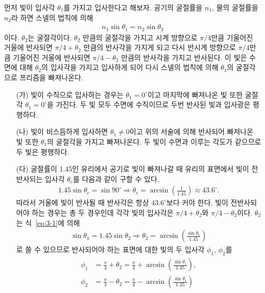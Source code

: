 \documentclass[tightenlines,floatfix,nofootinbib,superscriptaddress,fleqn]{revtex4-2}
\begin{document}
먼저 빛이 입사각 $\theta_1$를 가지고 입사한다고 해보자. 공기의 굴절률을 $n_1$,
물의 굴절률을 $n_2$라 하면 스넬의 법칙에 의해
\begin{align}\label{eq:3-1}
  n_1\sin\theta_1 = n_2\sin\theta_2
\end{align}
이다. $\theta_2$는 굴절각이다. $\theta_2$ 만큼의 굴절각을 가지고 
시계 방향으로 $\pi/4$만큼 기울어진 거울에 반사되면 $\pi/4+\theta_2$ 만큼의 반사각을
가지게 되고 다시 반시계 방향으로 $\pi/4$만큼 기울어진 거울에 반사되면 $\pi/4-\theta_2$
만큼의 반사각을 가지고 반사된다. 이 빛은 수면에 대해 $\theta_2$의 입사각을 가지고
입사하게 되어 다시 스넬의 법칙에 의해 $\theta_1$의 굴절각으로 프리즘을 빠져나온다.
\begin{itemize}
  \item[(가)]
  빛이 수직으로 입사하는 경우는 $\theta_1=0^\circ$이고 마지막에 빠져나온 빛 또한 굴절각
  $\theta_1=0^\circ$을 가진다. 두 빛 모두 수면에 수직이므로 두번 반사된 빛과 입사광은
  평행하다.
  \item[(나)]
  빛이 비스듬하게 입사하면 $\theta_1\neq 0$이고 위의 서술에 의해 반사되어 빠져나온 빛 또한
  $\theta_1$의 굴절각을 가지고 빠져나온다. 두 빛이 수면과 이루는 각도가 같으므로 두 빛은
  평행하다.
  \item[(다)] 
  굴절률이 1.45인 유리에서 공기로 빛이 빠져나갈 때 유리의 표면에서 빛이 전반사되는
  입사각 $\theta_c$를 다음과 같이 구할 수 있다.
  \begin{align}
    1.45\sin\theta_c = \sin90^\circ\Longrightarrow
    \theta_c = \arcsin\left(\frac{1}{1.45}\right)\approx 43.6^\circ.
  \end{align}
  따라서 거울에 빛이 반사될 때 반사각은 항상 $43.6^\circ$보다 커야 한다.
  빛이 전반사되어야 하는 경우는 총 두 경우인데 각각 빛의 입사각은 
  $\pi/4+\theta_2$와 $\pi/4-\theta_2$이다. $\theta_2$는 식~\eqref{eq:3-1}에 의해
  \begin{align}
    \sin\theta_1 = 1.45\sin\theta_2\Longrightarrow
    \theta_2 = \arcsin\left(\frac{\sin\theta_1}{1.45}\right)
  \end{align}
  로 쓸 수 있으므로 반사되어야 하는 표면에 대한 빛의 두 입사각 $\phi_1$, $\phi_2$를
  \begin{align}
    \begin{split}
      \phi_1 &= \frac{\pi}{4}+\theta_2 = \frac{\pi}{4}
      +\arcsin\left(\frac{\sin\theta_1}{1.45}\right), \\
      \phi_2 &= \frac{\pi}{4}-\theta_2 = \frac{\pi}{4}
      -\arcsin\left(\frac{\sin\theta_1}{1.45}\right)
    \end{split}

\end{align}
\end{itemize}
\end{document}
